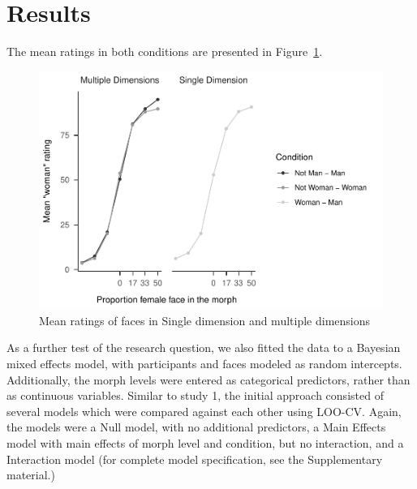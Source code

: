\documentclass[
  man]{apa7}
\begin{document}
\hypertarget{results-1}{%
\section{Results}\label{results-1}}

The mean ratings in both conditions are presented in Figure~\ref{fig:descriptives-two}.

\begin{figure}
\centering
\includegraphics{resp_opts_manus23022_files/figure-latex/descriptives-two-1.pdf}
\caption{\label{fig:descriptives-two}Mean ratings of faces in Single dimension and multiple dimensions}
\end{figure}

As a further test of the research question, we also fitted the data to a Bayesian mixed effects model, with participants and faces modeled as random intercepts. Additionally, the morph levels were entered as categorical predictors, rather than as continuous variables. Similar to study 1, the initial approach consisted of several models which were compared against each other using LOO-CV. Again, the models were a Null model, with no additional predictors, a Main Effects model with main effects of morph level and condition, but no interaction, and a Interaction model (for complete model specification, see the Supplementary material.)
\end{document}
